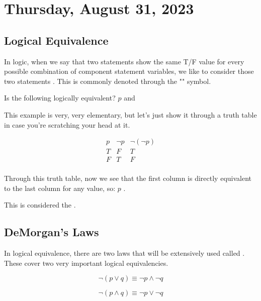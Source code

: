 \section{Thursday, August 31, 2023}
\subsection{Logical Equivalence}
In logic, when we say that two statements show the same T/F value for every possible combination of component statement variables, we like to consider those two statements . This is commonly denoted through the "\equiv" symbol.

\begin{example}
    Is the following logically equivalent? \(p\) and 
\end{example}

This example is very, very elementary, but let's just show it through a truth table in case you're scratching your head at it.

\begin{displaymath}
    \begin{array}{|c|c|c|}
    p & \neg{p} & \neg{(\neg{p})}\\ 
    \hline
    T & F & T\\
    F & T & F\\
    \end{array}
\end{displaymath}

Through this truth table, now we see that the first column is directly equivalent to the last column for any value, so: \(p\) \equiv {}.

This is considered the .

\subsection{DeMorgan's Laws}
In logical equivalence, there are two laws that will be extensively used called . These cover two very important logical equivalencies.

\begin{displaymath}
    \neg{(p \lor q)}\equiv \neg{p} \land \neg{q}
\end{displaymath}

\begin{displaymath}
    \neg{(p \land q)}\equiv \neg{p} \lor \neg{q}
\end{displaymath}
 
